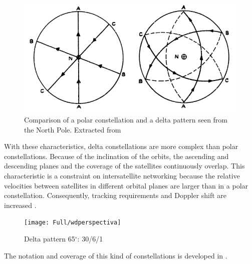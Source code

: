 \begin{figure}[H]
\centerline{\includegraphics[scale=0.4]{Full/polarvswalker.png}}
\caption[Comparison: polar const. and a delta pattern seen from the North Pole]{Comparison of a polar constellation and a delta pattern seen from the North Pole. Extracted from \cite{Walker1977}}
\label{fig:delta pattern North Pole}
\end{figure}

With these characteristics, delta constellations are more complex than polar constellations. Because of the inclination of the orbits, the ascending and descending planes and the coverage of the satellites continuously overlap. This characteristic is a constraint on intersatellite networking because the relative velocities between satellites in different orbital planes are larger than in a polar constellation. Consequently, tracking requirements and Doppler shift are increased \cite{Wood2003}.

\begin{figure}[H]
\centerline{\texttt{[image: Full/wdperspectiva]}}
\caption{Delta pattern 65$^{\circ}$: 30/6/1}
\label{fig:delta pattern notation}
\end{figure}

The notation and coverage of this kind of constellations is developed in \cite[Chapter 3, Section 4]{annex1}.